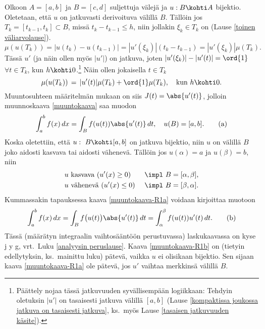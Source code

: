 Olkoon $A=[a,b]$ ja $B=[c,d]$ suljettuja välejä ja $u:B \kohti A$ bijektio. Oletetaan, että
$u$ on jatkuvasti derivoituva välillä $B$. Tällöin jos $T_k=[t_{k-1},t_k]\subset B$, missä 
$t_k-t_{k-1} \le h$, niin jollakin $\xi_k\in T_k$ on
(Lause \ref{toinen väliarvolause}).
\[ 
\mu(u(T_k)) = |u(t_k)-u(t_{k-1})| = |u'(\xi_k)|(t_k-t_{k-1}) = |u'(\xi_k)|\mu(T_k).
\]
Tässä $u'$ (ja näin ollen myös $|u'|$) on jatkuva, joten $|u'(\xi_k)|-|u'(t)|=\ord{1}$
$\forall t \in T_k$, kun $h \kohti 0$.\footnote[2]{Päättely nojaa tässä jatkuvuuden
syvällisempään logiikkaan: Tehdyin oletuksin $|u'|$ on tasaisesti jatkuva välillä $[a,b]$
(Lause \ref{kompaktissa joukossa jatkuva on tasaisesti jatkuva}, ks.\ myös Lause
\ref{tasaisen jatkuvuuden käsite}).} Näin ollen jokaisella $t \in T_k$
\[
\mu(u(T_k)) \,=\, |u'(t)|\mu(T_k)+\ord{1}\mu(T_k), \quad \text{kun}\ h \kohti 0.
\]
Muuntosuhteen määritelmän mukaan on siis $J(t)=\abs{u'(t)}$, jolloin muunnoskaava 
\eqref{muuntokaava} saa muodon
\begin{equation} \label{muuntokaava-R1a}
\int_a^b f(x)\,dx=\int_B f(u(t))\abs{u'(t)}\,dt, \quad u(B)=[a,b]. \tag{a}
\end{equation}
Koska oletettiin, että $u:\ B \kohti [a,b]$ on jatkuva bijektio, niin $u$ on välillä $B$ joko
aidosti kasvava tai aidosti vähenevä. Tällöin jos $u(\alpha)=a$ ja $u(\beta)=b$, niin
\begin{alignat*}{2}
&u\text{ kasvava } (u'(x)\geq 0) \ &&\impl \ B=[\alpha,\beta], \\
&u\text{ vähenevä } (u'(x)\leq 0) \ &&\impl \ B=[\beta,\alpha].
\end{alignat*}
Kummassakin tapauksessa kaava \eqref{muuntokaava-R1a} voidaan kirjoittaa muotoon
\begin{equation} \label{muuntokaava-R1b}
\int_a^b f(x)\,dx=\int_B f\bigl(u(t)\bigr)\abs{u'(t)}\,dt=\int_\alpha^\beta f(u(t))u'(t)\,dt.
\tag{b}
\end{equation}
Tässä (määrätyn integraalin vaihtosääntöön perustuvassa) laskukaavassa on kyse
j y g, vrt.\ Luku
\ref{analyysin peruslause}.
Kaava \eqref{muuntokaava-R1b} on (tietyin edellytyksin, ks.\ mainittu luku) pätevä, vaikka $u$
ei olisikaan bijektio. Sen sijaan kaava \eqref{muuntokaava-R1a}  ole pätevä, jos $u'$
vaihtaa merkkinsä välillä $B$.

